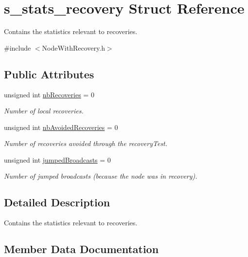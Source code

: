 \hypertarget{structs__stats__recovery}{}\section{s\+\_\+stats\+\_\+recovery Struct Reference}
\label{structs__stats__recovery}


Contains the statistics relevant to recoveries.  




{\ttfamily \#include $<$Node\+With\+Recovery.\+h$>$}

\subsection*{Public Attributes}
\begin{DoxyCompactItemize}
\item 
unsigned int \hyperlink{structs__stats__recovery_a89b2e116cf913c2939d186a2cd4f865b}{nb\+Recoveries} = 0
\begin{DoxyCompactList}\small\item\em Number of local recoveries. \end{DoxyCompactList}\item 
unsigned int \hyperlink{structs__stats__recovery_a0f21481940b624e49b0880d1bbf3df33}{nb\+Avoided\+Recoveries} = 0
\begin{DoxyCompactList}\small\item\em Number of recoveries avoided through the recovery\+Test. \end{DoxyCompactList}\item 
unsigned int \hyperlink{structs__stats__recovery_ad4ca0f06d00b8cb3a6998977ea146e10}{jumped\+Broadcasts} = 0
\begin{DoxyCompactList}\small\item\em Number of jumped broadcasts (because the node was in recovery). \end{DoxyCompactList}\end{DoxyCompactItemize}


\subsection{Detailed Description}
Contains the statistics relevant to recoveries. 



\subsection{Member Data Documentation}
\mbox{\label{structs__stats__recovery_ad4ca0f06d00b8cb3a6998977ea146e10}} 
